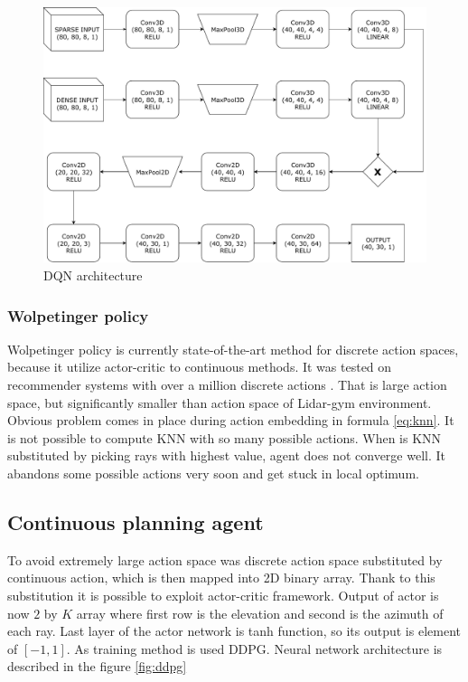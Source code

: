 \vspace{3mm}
\begin{figure}[!h]
\centering
\includegraphics[scale=0.6]{fig/dql.pdf}
\caption{DQN architecture}
\label{fig:dqn}
\end{figure}

\subsubsection{Wolpetinger policy}
Wolpetinger policy is currently state-of-the-art method for discrete action spaces, because it utilize actor-critic to continuous methods. It was tested on recommender systems with over a million discrete actions \cite{dulac2015}. That is large action space, but significantly smaller than action space of Lidar-gym environment. Obvious problem comes in place during action embedding in formula \eqref{eq:knn}. It is not possible to compute KNN with so many possible actions. When is KNN substituted by picking rays with highest value, agent does not converge well. It abandons some possible actions very soon and get stuck in local optimum.

\clearpage
\subsection{Continuous planning agent}
To avoid extremely large action space was discrete action space substituted by continuous action, which is then mapped into 2D binary array. Thank to this substitution it is possible to exploit actor-critic framework. Output of actor is now $2$ by $K$ array where first row is the elevation and second is the azimuth of each ray. Last layer of the actor network is tanh function, so its output is element of $[-1, 1]$. As training method is used DDPG. Neural network architecture is described in the figure \ref{fig:ddpg}

